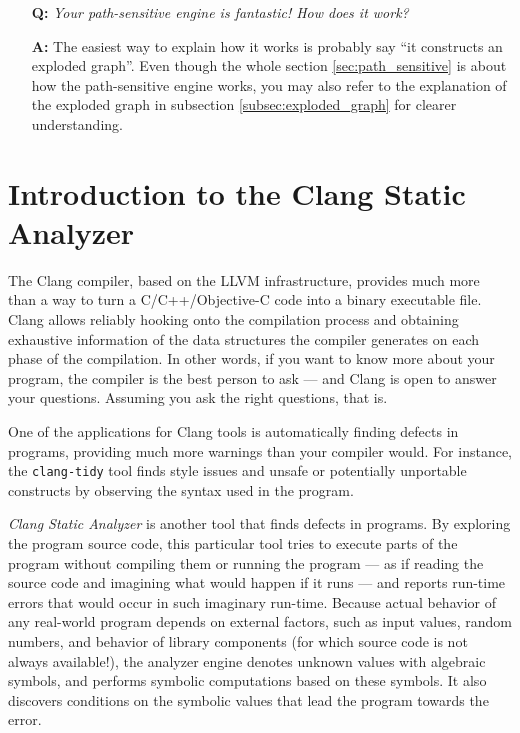 \documentclass[a4paper,12pt]{article}
\begin{document}
\begin{itemize}
\item[\textbf{Q:}] \emph{Your path-sensitive engine is fantastic! How does it work?}
\item[\textbf{A:}] The easiest way to explain how it works is probably say ``it constructs an exploded graph''. Even though the whole section \ref{sec:path_sensitive} is about how the path-sensitive engine works, you may also refer to the explanation of the exploded graph in subsection \ref{subsec:exploded_graph} for clearer understanding.
\end{itemize}
\medskip


\newpage
\section{Introduction to the Clang Static Analyzer}\label{sec:intro}

The Clang compiler, based on the LLVM infrastructure, provides much more than a way to turn a C/C++/Objective-C code into a binary executable file. Clang allows reliably hooking onto the compilation process and obtaining exhaustive information of the data structures the compiler generates on each phase of the compilation. In other words, if you want to know more about your program, the compiler is the best person to ask --- and Clang is open to answer your questions. Assuming you ask the right questions, that is.

One of the applications for Clang tools is automatically finding defects in programs, providing much more warnings than your compiler would. For instance, the \lstinline|clang-tidy| tool finds style issues and unsafe or potentially unportable constructs by observing the syntax used in the program.

\emph{Clang Static Analyzer} is another tool that finds defects in programs. By exploring the program source code, this particular tool tries to execute parts of the program without compiling them or running the program --- as if reading the source code and imagining what would happen if it runs --- and reports run-time errors that would occur in such imaginary run-time. Because actual behavior of any real-world program depends on external factors, such as input values, random numbers, and behavior of library components (for which source code is not always available!), the analyzer engine denotes unknown values with algebraic symbols, and performs symbolic computations based on these symbols. It also discovers conditions on the symbolic values that lead the program towards the error.
\end{document}
